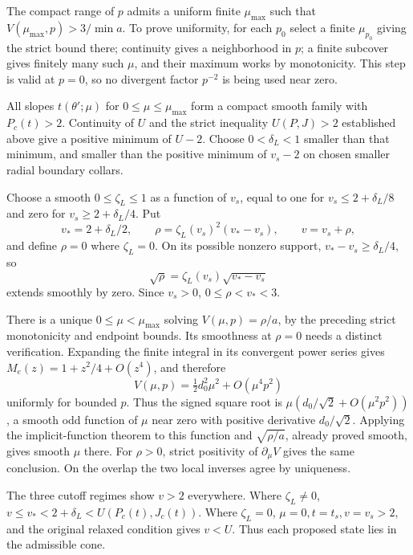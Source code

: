 \documentclass[10pt,a4paper]{article}
\begin{document}
The compact range of \(p\) admits a uniform finite \(\mu_{\max}\) such that \(V(\mu_{\max},p)>3/\min a\). To prove uniformity, for each \(p_0\) select a finite \(\mu_{p_0}\) giving the strict bound there; continuity gives a neighborhood in \(p\); a finite subcover gives finitely many such \(\mu\), and their maximum works by monotonicity. This step is valid at \(p=0\), so no divergent factor \(p^{-2}\) is being used near zero.

All slopes \(t(\theta';\mu)\) for \(0\le\mu\le\mu_{\max}\) form a compact smooth family with \(P_c(t)>2\). Continuity of \(U\) and the strict inequality \(U(P,J)>2\) established above give a positive minimum of \(U-2\). Choose \(0<\delta_L<1\) smaller than that minimum, and smaller than the positive minimum of \(v_s-2\) on chosen smaller radial boundary collars.

Choose a smooth \(0\le\zeta_L\le1\) as a function of \(v_s\), equal to one for \(v_s\le2+\delta_L/8\) and zero for \(v_s\ge2+\delta_L/4\). Put \[
v_*=2+\delta_L/2,\qquad
\rho=\zeta_L(v_s)^2(v_*-v_s),\qquad
v=v_s+\rho,
\] and define \(\rho=0\) where \(\zeta_L=0\). On its possible nonzero support, \(v_*-v_s\ge\delta_L/4\), so \[
\sqrt\rho=\zeta_L(v_s)\sqrt{v_*-v_s}
\] extends smoothly by zero. Since \(v_s>0\), \(0\le\rho<v_*<3\).

There is a unique \(0\le\mu<\mu_{\max}\) solving \(V(\mu,p)=\rho/a\), by the preceding strict monotonicity and endpoint bounds. Its smoothness at \(\rho=0\) needs a distinct verification. Expanding the finite integral in its convergent power series gives \(M_e(z)=1+z^2/4+O(z^4)\), and therefore \[
V(\mu,p)=\tfrac12d_0^2\mu^2+O(\mu^4p^2)
\] uniformly for bounded \(p\). Thus the signed square root is \(\mu(d_0/\sqrt2+O(\mu^2p^2))\), a smooth odd function of \(\mu\) near zero with positive derivative \(d_0/\sqrt2\). Applying the implicit-function theorem to this function and \(\sqrt{\rho/a}\), already proved smooth, gives smooth \(\mu\) there. For \(\rho>0\), strict positivity of \(\partial_\mu V\) gives the same conclusion. On the overlap the two local inverses agree by uniqueness.

The three cutoff regimes show \(v>2\) everywhere. Where \(\zeta_L\ne0\), \(v\le v_*<2+\delta_L<U(P_c(t),J_c(t))\). Where \(\zeta_L=0\), \(\mu=0,t=t_s,v=v_s>2\), and the original relaxed condition gives \(v<U\). Thus each proposed state lies in the admissible cone.
\end{document}
